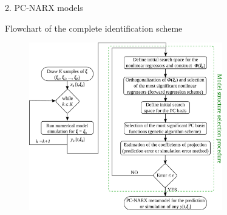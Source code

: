 \documentclass[10pt,xcolor = dvipsnames]{beamer}
\newcommand{\vc}[1]{\vspace*{#1cm}}
\begin{document}
\begin{frame}[t]{2. PC-NARX models}

\vc{-0.3}
\begin{block}{\small Flowchart of the complete identification scheme}
\begin{figure}
{\includegraphics[width=0.75\textwidth]{flowchart.pdf}}
\end{figure}
\end{block}
\end{frame}
\end{document}
